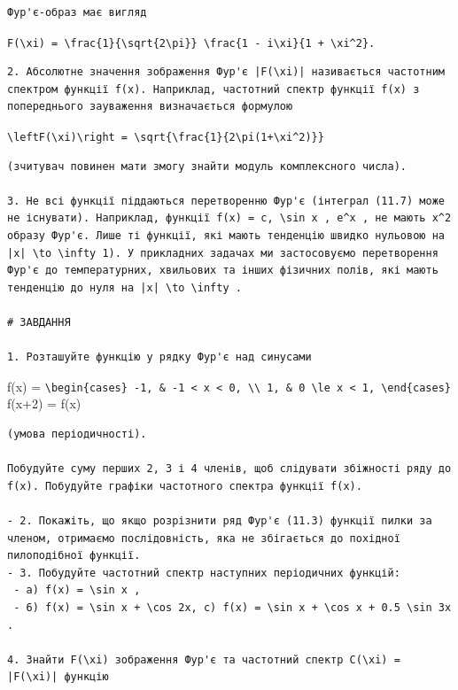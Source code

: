 \documentclass[
  ukrainian,
]{article}
\begin{document}
\begin{verbatim}
Фур'є-образ має вигляд
\end{verbatim}

\texttt{F(\textbackslash{}xi)\ =\ \textbackslash{}frac\{1\}\{\textbackslash{}sqrt\{2\textbackslash{}pi\}\}\ \textbackslash{}frac\{1\ -\ i\textbackslash{}xi\}\{1\ +\ \textbackslash{}xi\^{}2\}.}

\begin{verbatim}
2. Абсолютне значення зображення Фур'є |F(\xi)| називається частотним спектром функції f(x). Наприклад, частотний спектр функції f(x) з попереднього зауваження визначається формулою
\end{verbatim}

\texttt{\textbackslash{}left\textbar{}F(\textbackslash{}xi)\textbackslash{}right\textbar{}\ =\ \textbackslash{}sqrt\{\textbackslash{}frac\{1\}\{2\textbackslash{}pi(1+\textbackslash{}xi\^{}2)\}\}}

\begin{verbatim}
(зчитувач повинен мати змогу знайти модуль комплексного числа).

3. Не всі функції піддаються перетворенню Фур'є (інтеграл (11.7) може не існувати). Наприклад, функції f(x) = c, \sin x , e^x , не мають x^2 образу Фур'є. Лише ті функції, які мають тенденцію швидко нульовою на |x| \to \infty 1). У прикладних задачах ми застосовуємо перетворення Фур'є до температурних, хвильових та інших фізичних полів, які мають тенденцію до нуля на |x| \to \infty .

# ЗАВДАННЯ

1. Розташуйте функцію у рядку Фур'є над синусами
\end{verbatim}

f(x) =
\texttt{\textbackslash{}begin\{cases\}\ -1,\ \&\ -1\ \textless{}\ x\ \textless{}\ 0,\ \textbackslash{}\textbackslash{}\ 1,\ \&\ 0\ \textbackslash{}le\ x\ \textless{}\ 1,\ \textbackslash{}end\{cases\}}
f(x+2) = f(x)

\begin{verbatim}
(умова періодичності).

Побудуйте суму перших 2, 3 і 4 членів, щоб слідувати збіжності ряду до f(x). Побудуйте графіки частотного спектра функції f(x).

- 2. Покажіть, що якщо розрізнити ряд Фур'є (11.3) функції пилки за членом, отримаємо послідовність, яка не збігається до похідної пилоподібної функції.
- 3. Побудуйте частотний спектр наступних періодичних функцій:
 - a) f(x) = \sin x ,
 - 6) f(x) = \sin x + \cos 2x, c) f(x) = \sin x + \cos x + 0.5 \sin 3x .

4. Знайти F(\xi) зображення Фур'є та частотний спектр C(\xi) = |F(\xi)| функцію
\end{verbatim}
\end{document}
